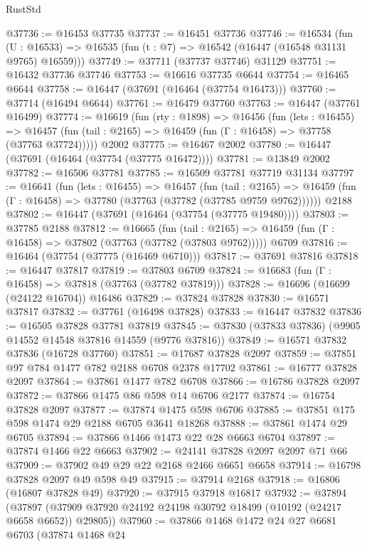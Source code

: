 \begin{lexlean}{RustStd}
\begin{coremodule}
@37736 := @16453 @37735
@37737 := @16451 @37736
@37746 := @16534
    (fun (U : @16533) => @16535 (fun (t : @7) => @16542 (@16447 (@16548 @31131 @9765) @16559)))
@37749 := @37711 (@37737 @37746) @31129
@37751 := @16432 @37736 @37746
@37753 := @16616 @37735 @6644
@37754 := @16465 @6644
@37758 := @16447 (@37691 (@16464 (@37754 @16473)))
@37760 := @37714 (@16494 @6644)
@37761 := @16479 @37760
@37763 := @16447 (@37761 @16499)
@37774 := @16619
    (fun (rty : @1898) =>
    @16456
      (fun (lets : @16455) =>
      @16457 (fun (tail : @2165) => @16459 (fun (Γ : @16458) => @37758 (@37763 @37724)))))
    @2002
@37775 := @16467 @2002
@37780 := @16447 (@37691 (@16464 (@37754 (@37775 @16472))))
@37781 := @13849 @2002
@37782 := @16506 @37781
@37785 := @16509 @37781 @37719 @31134
@37797 := @16641
    (fun (lets : @16455) =>
    @16457
      (fun (tail : @2165) =>
      @16459 (fun (Γ : @16458) => @37780 (@37763 (@37782 (@37785 @9759 @9762))))))
    @2188
@37802 := @16447 (@37691 (@16464 (@37754 (@37775 @19480))))
@37803 := @37785 @2188
@37812 := @16665
    (fun (tail : @2165) => @16459 (fun (Γ : @16458) => @37802 (@37763 (@37782 (@37803 @9762)))))
    @6709
@37816 := @16464 (@37754 (@37775 (@16469 @6710)))
@37817 := @37691 @37816
@37818 := @16447 @37817
@37819 := @37803 @6709
@37824 := @16683 (fun (Γ : @16458) => @37818 (@37763 (@37782 @37819)))
@37828 := @16696 (@16699 (@24122 @16704)) @16486
@37829 := @37824 @37828
@37830 := @16571 @37817
@37832 := @37761 (@16498 @37828)
@37833 := @16447 @37832
@37836 := @16505 @37828 @37781 @37819
@37845 := @37830 (@37833 @37836) (@9905 @14552 @14548 @37816 @14559 (@9776 @37816))
@37849 := @16571 @37832 @37836 (@16728 @37760)
@37851 := @17687 @37828 @2097
@37859 := @37851 @97 @784 @1477 @782 @2188 @6708 @2378 @17702
@37861 := @16777 @37828 @2097
@37864 := @37861 @1477 @782 @6708
@37866 := @16786 @37828 @2097
@37872 := @37866 @1475 @86 @598 @14 @6706 @2177
@37874 := @16754 @37828 @2097
@37877 := @37874 @1475 @598 @6706
@37885 := @37851 @175 @598 @1474 @29 @2188 @6705 @3641 @18268
@37888 := @37861 @1474 @29 @6705
@37894 := @37866 @1466 @1473 @22 @28 @6663 @6704
@37897 := @37874 @1466 @22 @6663
@37902 := @24141 @37828 @2097 @2097 @71 @66
@37909 := @37902 @49 @29 @22 @2168 @2466 @6651 @6658
@37914 := @16798 @37828 @2097 @49 @598 @49
@37915 := @37914 @2168
@37918 := @16806 (@16807 @37828 @49)
@37920 := @37915 @37918 @16817
@37932 := @37894
    (@37897 (@37909 @37920 @24192 @24198 @30792 @18499 (@10192 (@24217 @6658 @6652)) @29805))
@37960 := @37866
    @1468
    @1472
    @24
    @27
    @6681
    @6703
    (@37874
      @1468
      @24

\end{coremodule}
\end{lexlean}
